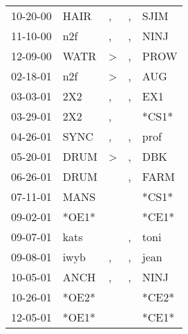 \begin{supertabular}{p{0.07\textwidth}p{0.06\textwidth}p{0.02\textwidth}p{0.02\textwidth}p{0.06\textwidth}}
 10-20-00\textsuperscript{} &         HAIR\textsuperscript{} &             , &             , &           SJIM\textsuperscript{} \\
 11-10-00\textsuperscript{} &          n2f\textsuperscript{} &             , &             , &           NINJ\textsuperscript{} \\
 12-09-00\textsuperscript{} &         WATR\textsuperscript{} &  \textgreater &             , &           PROW\textsuperscript{} \\
 02-18-01\textsuperscript{} &          n2f\textsuperscript{} &  \textgreater &             , &            AUG\textsuperscript{} \\
 03-03-01\textsuperscript{} &          2X2\textsuperscript{} &             , &             , &            EX1\textsuperscript{} \\
 03-29-01\textsuperscript{} &          2X2\textsuperscript{} &             , &               &                            *CS1* \\
 04-26-01\textsuperscript{} &         SYNC\textsuperscript{} &             , &             , &           prof\textsuperscript{} \\
 05-20-01\textsuperscript{} &         DRUM\textsuperscript{} &  \textgreater &             , &            DBK\textsuperscript{} \\
 06-26-01\textsuperscript{} &         DRUM\textsuperscript{} &               &             , &           FARM\textsuperscript{} \\
 07-11-01\textsuperscript{} &         MANS\textsuperscript{} &               &               &                            *CS1* \\
 09-02-01\textsuperscript{} &                          *OE1* &               &               &                            *CE1* \\
 09-07-01\textsuperscript{} &         kats\textsuperscript{} &               &             , &           toni\textsuperscript{} \\
 09-08-01\textsuperscript{} &         iwyb\textsuperscript{} &             , &             , &           jean\textsuperscript{} \\
 10-05-01\textsuperscript{} &         ANCH\textsuperscript{} &             , &             , &           NINJ\textsuperscript{} \\
 10-26-01\textsuperscript{} &                          *OE2* &               &               &                            *CE2* \\
 12-05-01\textsuperscript{} &                          *OE1* &               &               &                            *CE1* \\

\end{supertabular}
